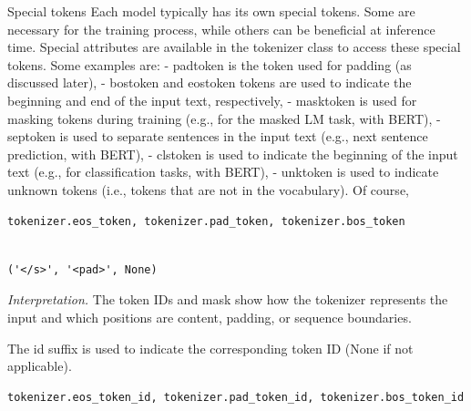 \documentclass[../labs.tex]{subfiles}
\begin{document}
\noindent Special tokens Each model typically has its own special tokens. Some are necessary for the training process, while others can be beneficial at inference time. Special attributes are available in the tokenizer class to access these special tokens. Some examples are: - padtoken is the token used for padding (as discussed later), - bostoken and eostoken tokens are used to indicate the beginning and end of the input text, respectively, - masktoken is used for masking tokens during training (e.g., for the masked LM task, with BERT), - septoken is used to separate sentences in the input text (e.g., next sentence prediction, with BERT), - clstoken is used to indicate the beginning of the input text (e.g., for classification tasks, with BERT), - unktoken is used to indicate unknown tokens (i.e., tokens that are not in the vocabulary). Of course,

\begin{lstlisting}[language=Python,basicstyle=\ttfamily\scriptsize,breaklines=true,breakatwhitespace=false,columns=fullflexible,keepspaces=true,numbers=none]
tokenizer.eos_token, tokenizer.pad_token, tokenizer.bos_token
\end{lstlisting}

\hypertarget{res:lab02-text-01-t5-ipynb-26-d7380f47e905}{}

\begin{lstlisting}[basicstyle=\ttfamily\scriptsize,breaklines=true,breakatwhitespace=false,columns=fullflexible,keepspaces=true]

('</s>', '<pad>', None)

\end{lstlisting}

\noindent\emph{Interpretation.} The token IDs and mask show how the tokenizer represents the input and which positions are content, padding, or sequence boundaries.



\noindent The id suffix is used to indicate the corresponding token ID (None if not applicable).

\begin{lstlisting}[language=Python,basicstyle=\ttfamily\scriptsize,breaklines=true,breakatwhitespace=false,columns=fullflexible,keepspaces=true,numbers=none]
tokenizer.eos_token_id, tokenizer.pad_token_id, tokenizer.bos_token_id
\end{lstlisting}
\end{document}
